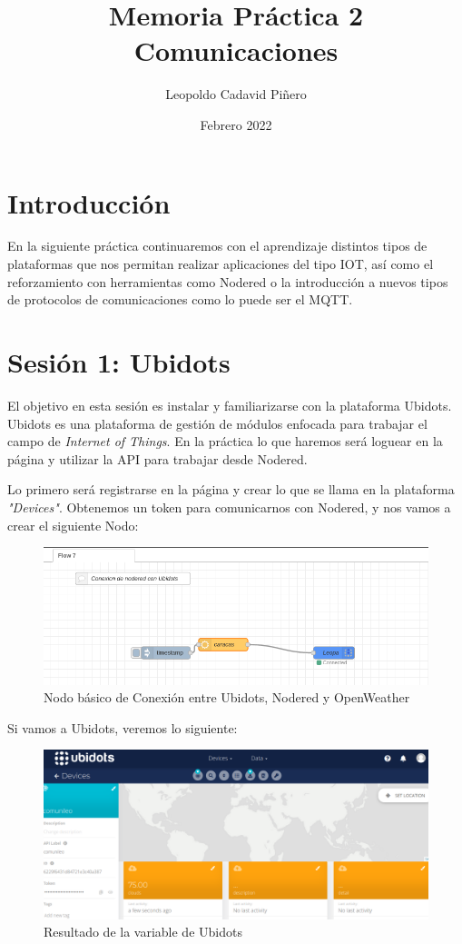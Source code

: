\documentclass[12pt, a4paper]{article}
\title{Memoria Práctica 2 \\


\large Comunicaciones
}
\author{
Leopoldo Cadavid Piñero
}
\date{Febrero 2022}
\begin{document}
\maketitle
\newpage
\tableofcontents
\newpage
\section{Introducción}
      
En la siguiente práctica continuaremos con el aprendizaje distintos tipos de plataformas que nos permitan realizar aplicaciones del 
tipo IOT, así como el reforzamiento con herramientas como Nodered o la introducción a nuevos tipos de protocolos de comunicaciones 
como lo puede ser el MQTT. 

\section{Sesión 1: Ubidots}
El objetivo en esta sesión es instalar y familiarizarse con la plataforma Ubidots. Ubidots es una plataforma de gestión de módulos enfocada para 
trabajar el campo de \textit{Internet of Things}. En la práctica lo que haremos será loguear en la página y utilizar la API para trabajar desde Nodered.

Lo primero será registrarse en la página y crear lo que se llama en la plataforma \textit{"Devices"}. Obtenemos un token para comunicarnos con Nodered, y 
nos vamos a crear el siguiente Nodo:

\begin{figure}[H]
    \centering
    \includegraphics[scale=0.4]{nodered_ubidots.png}
    \caption{Nodo básico de Conexión entre Ubidots, Nodered y OpenWeather}
\end{figure}

Si vamos a Ubidots, veremos lo siguiente: 

\begin{figure}[H]
    \centering
    \includegraphics[scale=0.3]{deviceprimero.png}
    \caption{Resultado de la variable de Ubidots}
\end{figure}
\end{document}
